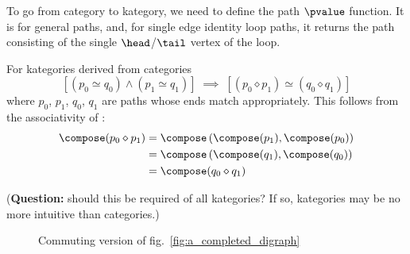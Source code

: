\documentclass[11pt,openany]{book}
\begin{document}
To go from category to kategory, we need to define the 
path $\pvalue$ function.
It is \compose for general paths, and, 
for single edge identity loop paths,
it returns the 
path consisting of the single 
$\head$/$\tail$ vertex of the loop.

For kategories derived from categories
\begin{equation*}
\left[ \left( p_0 \simeq q_0 \right) \wedge 
 \left( p_1 \simeq q_1  \right) \right]
\; \implies \; 
\left[
\left( p_0 \diamond p_1 \right)
\simeq
\left( q_0 \diamond q_1 \right)
\right]
\end{equation*}
where $p_0$, $p_1$, $q_0$, $q_1$ are paths 
whose ends match appropriately.
This follows from the associativity of \compose:
\begin{align*}
\compose(p_0 \diamond p_1) 
& = 
\compose \left( 
\compose(p_1),
\compose(p_0) \right)
\\
& = 
\compose \left( 
\compose(q_1),
\compose(q_0) \right)
\\
& = 
\compose(q_0 \diamond q_1) 
\end{align*}
 
(\textbf{Question:} should this be required of all kategories?
If so, kategories may be no more intuitive than categories.)

\label{sec:Diagram}

\begin{definition}
\end{definition}

\begin{figure}
\centering
{}
\caption{Commuting version of fig.~\ref{fig:a_completed_digraph}}
\label{fig:a_commuting_diagram}
\end{figure}
\end{document}
